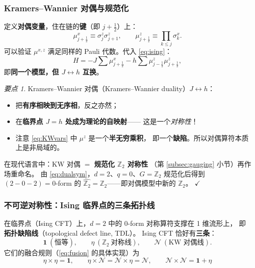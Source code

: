 \documentclass[UTF8,a4paper,11pt]{ctexart}
\theoremstyle{plain}
\theoremstyle{definition}
\theoremstyle{remark}
\newtheorem{keypoint}{要点}[section]
\newcommand{\ZZ}{\mathbb{Z}}
\newcommand{\en}[1]{\textsf{#1}}       %
\begin{document}
\subsubsection{Kramers--Wannier 对偶与规范化}
\label{subsec:KW}

定义\textbf{对偶变量}，住在链的\textbf{键}（即 $j+\tfrac12$）上：
\begin{equation}
  \mu^x_{j+\frac12}\equiv\sigma^z_j\sigma^z_{j+1},
  \qquad
  \mu^z_{j+\frac12}\equiv\prod_{k\le j}\sigma^x_k .
  \label{eq:KWvars}
\end{equation}
可以验证 $\mu^{x,z}$ 满足同样的 Pauli 代数。代入 \eqref{eq:ising}：
\begin{equation}
  H=-J\sum \mu^x_{j+\frac12}
    -h\sum \mu^z_{j-\frac12}\mu^z_{j+\frac12} ,
  \label{eq:isingdual}
\end{equation}
即\textbf{同一个模型，但 $J\leftrightarrow h$ 互换}。

\begin{keypoint}
\label{kp:KW}
Kramers--Wannier 对偶（\en{Kramers--Wannier duality}）$J\leftrightarrow h$：
\begin{itemize}
  \item 把\textbf{有序相映到无序相}，反之亦然；
  \item 在\textbf{临界点 $J=h$ 处成为理论的自映射}——
        这是一个\emph{对称性}！
  \item 注意 \eqref{eq:KWvars} 中 $\mu^z$ 是一个\textbf{半无穷乘积}，
        即一个\textbf{缺陷}。所以对偶算符本质上是非局域的。
\end{itemize}
在现代语言中：KW 对偶 $=$ \textbf{规范化 $\ZZ_2$ 对称性}
（第 \ref{subsec:gauging} 小节）再作场重命名。
由 \eqref{eq:dualsym}，$d=2$、$q=0$、$G=\ZZ_2$ 规范化后得到
$(2-0-2)=0$-form 的 $\hat{\ZZ_2}=\ZZ_2$——即对偶模型中新的 $\ZZ_2$。
$\checkmark$
\end{keypoint}

\subsubsection{不可逆对称性：Ising 临界点的三条拓扑线}
\label{subsec:isingTDL}

在临界点（Ising CFT）上，$d=2$ 中的 0-form 对称算符支撑在 1 维流形上，
即\textbf{拓扑缺陷线}（\en{topological defect line}, TDL）。
Ising CFT 恰好有\textbf{三条}：
\begin{equation}
  \mathbf 1\ (\text{恒等}),
  \qquad
  \eta\ (\ZZ_2\ \text{对称线}),
  \qquad
  \mathcal N\ (\text{KW 对偶线}) .
\end{equation}
它们的融合规则（\eqref{eq:fusion} 的具体实现）为
\begin{equation}
  \boxed{\
  \eta\times\eta=\mathbf 1,
  \qquad
  \eta\times\mathcal N=\mathcal N\times\eta=\mathcal N,
  \qquad
  \mathcal N\times\mathcal N=\mathbf 1+\eta\ }
  \label{eq:isingfusion}
\end{equation}
\end{document}
